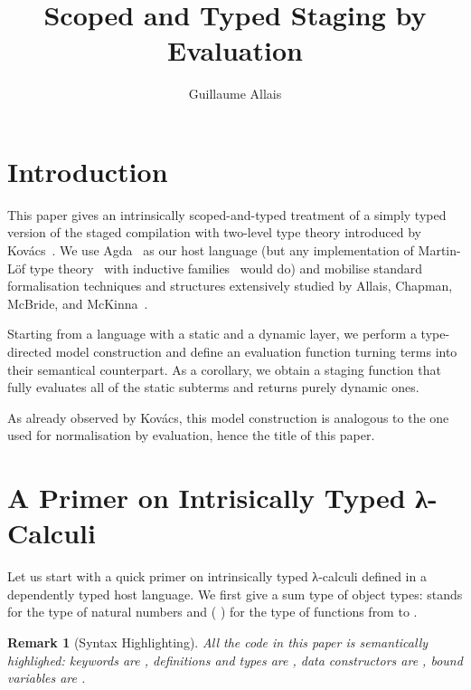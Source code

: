 \documentclass{article}
\title{Scoped and Typed Staging by Evaluation}
\author{Guillaume Allais}
\newtheorem*{remark}{Remark}
\begin{document}
\maketitle

\section{Introduction}

This paper gives an intrinsically scoped-and-typed
treatment of a simply typed version of the staged compilation
with two-level type theory introduced by
Kov{\'{a}}cs~\cite{DBLP:journals/pacmpl/Kovacs22}.
%
We use Agda~\cite{DBLP:conf/afp/Norell08}
as our host language (but any implementation
of Martin-Löf type theory~\cite{DBLP:books/daglib/0000395}
with inductive families~\cite{DBLP:journals/fac/Dybjer94}
would do)
and mobilise standard formalisation techniques and structures
extensively studied by Allais, Chapman,
McBride, and McKinna~\cite{DBLP:conf/cpp/Allais0MM17}.

Starting from a language with a static and a dynamic layer,
we perform a type-directed model construction
and define an evaluation function turning terms
into their semantical counterpart.
%
As a corollary, we obtain a staging function that
fully evaluates all of the static subterms and returns
purely dynamic ones.

As already observed by Kov{\'{a}}cs, this model construction
is analogous to the one used for normalisation by evaluation,
hence the title of this paper.

\section{A Primer on Intrisically Typed λ-Calculi}

Let us start with a quick primer on intrinsically typed λ-calculi
defined in a dependently typed host language.
%
We first give a sum type of object types:  stands
for the type of natural numbers and (  )
for the type of functions from  to .


\begin{remark}[Syntax Highlighting]
  All the code in this paper is semantically highlighed:
  keywords are , definitions and types are ,
  data constructors are , bound variables are
  .
\end{remark}
\end{document}
